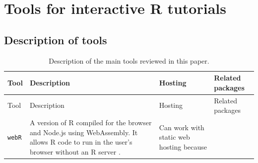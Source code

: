 \documentclass[
  12pt]{article}
\begin{document}
\section{Tools for interactive R tutorials}\label{sec-tools}

\subsection{Description of tools}\label{description-of-tools}

\begin{longtable}[]{@{}
  >{\raggedright\arraybackslash}p{}
  >{\raggedright\arraybackslash}p{}
  >{\raggedright\arraybackslash}p{}
  >{\raggedright\arraybackslash}p{}@{}}
\caption{Description of the main tools reviewed in this
paper.}\label{tbl-tools}\tabularnewline
\toprule\noalign{}
\begin{minipage}[b]{\linewidth}\raggedright
Tool
\end{minipage} & \begin{minipage}[b]{\linewidth}\raggedright
Description
\end{minipage} & \begin{minipage}[b]{\linewidth}\raggedright
Hosting
\end{minipage} & \begin{minipage}[b]{\linewidth}\raggedright
Related packages
\end{minipage} \\
\midrule\noalign{}
\endfirsthead
\toprule\noalign{}
\begin{minipage}[b]{\linewidth}\raggedright
Tool
\end{minipage} & \begin{minipage}[b]{\linewidth}\raggedright
Description
\end{minipage} & \begin{minipage}[b]{\linewidth}\raggedright
Hosting
\end{minipage} & \begin{minipage}[b]{\linewidth}\raggedright
Related packages
\end{minipage} \\
\midrule\noalign{}
\endhead
\bottomrule\noalign{}
\endlastfoot
\texttt{webR} & A version of R compiled for the browser and Node.js
using WebAssembly. It allows R code to run in the user's browser without
an R server \citep{webRdocs}. & Can work with static web hosting because

\end{longtable}
\end{document}
